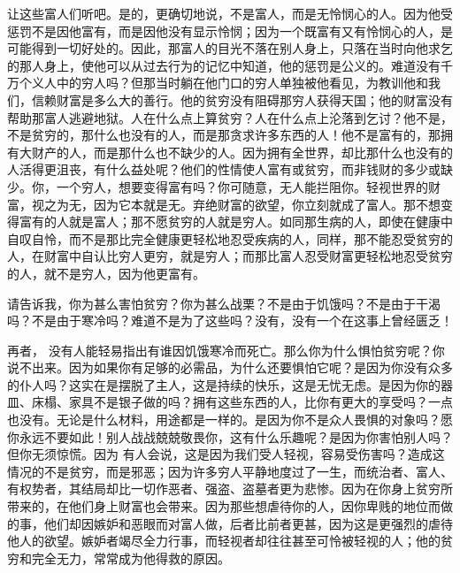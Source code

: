 让这些富人们听吧。是的，更确切地说，不是富人，而是无怜悯心的人。因为他受惩罚不是因他富有，而是因他没有显示怜悯；因为一个既富有又有怜悯心的人，是可能得到一切好处的。因此，那富人的目光不落在别人身上，只落在当时向他求乞的那人身上，使他可以从过去行为的记忆中知道，他的惩罚是公义的。难道没有千万个义人中的穷人吗？但那当时躺在他门口的穷人单独被他看见，为教训他和我们，信赖财富是多么大的善行。他的贫穷没有阻碍那穷人获得天国；他的财富没有帮助那富人逃避地狱。人在什么点上算贫穷？人在什么点上沦落到乞讨？他不是，不是贫穷的，那什么也没有的人，而是那贪求许多东西的人！他不是富有的，那拥有大财产的人，而是那什么也不缺少的人。因为拥有全世界，却比那什么也没有的人活得更沮丧，有什么益处呢？他们的性情使人富有或贫穷，而非钱财的多少或缺少。你，一个穷人，想要变得富有吗？你可随意，无人能拦阻你。轻视世界的财富，视之为无，因为它本就是无。弃绝财富的欲望，你立刻就成了富人。那不想变得富有的人就是富人；那不愿贫穷的人就是穷人。如同那生病的人，即使在健康中自叹自怜，而不是那比完全健康更轻松地忍受疾病的人，同样，那不能忍受贫穷的人，在财富中自认比穷人更穷，就是穷人；而那比富人忍受财富更轻松地忍受贫穷的人，就不是穷人，因为他更富有。\par

请告诉我，你为甚么害怕贫穷？你为甚么战栗？不是由于饥饿吗？不是由于干渴吗？不是由于寒冷吗？难道不是为了这些吗？没有，没有一个在这事上曾经匮乏！\par

再者， 没有人能轻易指出有谁因饥饿寒冷而死亡。那么你为什么惧怕贫穷呢？你说不出来。因为如果你有足够的必需品，为什么还要惧怕它呢？是因为你没有众多的仆人吗？这实在是摆脱了主人，这是持续的快乐，这是无忧无虑。是因为你的器皿、床榻、家具不是银子做的吗？拥有这些东西的人，比你有更大的享受吗？一点也没有。无论是什么材料，用途都是一样的。是因为你不是众人畏惧的对象吗？愿你永远不要如此！别人战战兢兢敬畏你，这有什么乐趣呢？是因为你害怕别人吗？但你无须惊慌。因为 有人会说，这是因为我们受人轻视，容易受伤害吗？造成这情况的不是贫穷，而是邪恶；因为许多穷人平静地度过了一生，而统治者、富人、有权势者，其结局却比一切作恶者、强盗、盗墓者更为悲惨。因为在你身上贫穷所带来的，在他们身上财富也会带来。因为那些想虐待你的人，因你卑贱的地位而做的事，他们却因嫉妒和恶眼而对富人做，后者比前者更甚，因为这是更强烈的虐待他人的欲望。嫉妒者竭尽全力行事，而轻视者却往往甚至可怜被轻视的人；他的贫穷和完全无力，常常成为他得救的原因。\par

